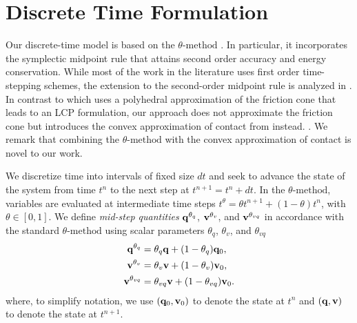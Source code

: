 \section{Discrete Time Formulation}
\label{sec:discrete_time_formulation}

Our discrete-time model is based on the $\theta\text{-method}$ \cite[\S
II.7]{bib:hairer2008solving}. In particular, it incorporates the symplectic
midpoint rule that attains second order accuracy and energy conservation. While
most of the work in the literature uses first order time-stepping schemes, the
extension to the second-order midpoint rule is analyzed in
\cite{bib:potra2006linearly}. In contrast to \cite{bib:potra2006linearly} which
uses a polyhedral approximation of the friction cone that leads to an LCP
formulation, our approach does not approximate the friction cone but introduces
the convex approximation of contact from \cite{bib:anitescu2006} instead.
. We remark
that combining the $\theta\text{-method}$ with the convex approximation of
contact is novel to our work. 

We discretize time into intervals of fixed size $dt$ and seek to advance the
state of the system from time $t^n$ to the next step at $t^{n+1} = t^n + dt$. In
the $\theta\text{-method}$, variables are evaluated at intermediate time steps
$t^\theta = \theta t^{n+1}+(1-\theta)t^{n}$, with $\theta \in [0, 1]$. We define
\emph{mid-step quantities} ${\mathbf{q}}^{\theta_{q}}$, ${\mathbf{v}}^{\theta_{v}}$, and
${\mathbf{v}}^{\theta_{vq}}$ in accordance with the standard $\theta\text{-method}$
using scalar parameters $\theta_q$, $\theta_v$, and $\theta_{vq}$
\begin{align}
	\mf{q}^{\theta_q} &= \theta_q\mf{q} + (1-\theta_{q})\mf{q}_0,\nonumber\\
	\mf{v}^{\theta_v} &= \theta_v\mf{v} + (1-\theta_v)\mf{v}_0,\nonumber\\
	\mf{v}^{\theta_{vq}} &= \theta_{vq}\mf{v} + (1-\theta_{vq})\mf{v}_0.
	\label{eq:theta_method}
\end{align}
where, to simplify notation, we use $({\mathbf{q}}_0, {\mathbf{v}}_0)$ to denote the state
at $t^n$ and $({\mathbf{q}}, {\mathbf{v}})$ to denote the state at $t^{n+1}$.

